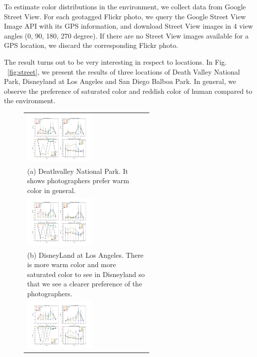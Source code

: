 To estimate color distributions in the environment, we collect data from Google Street View.
For each geotagged Flickr photo, we query the Google Street View Image API with its GPS information, and download Street View images in 4 view angles (0, 90, 180, 270 degree). If there are no Street View images available for a GPS location, we discard the corresponding Flickr photo.

The result turns out to be very interesting in respect to locations. In Fig. ~\ref{fig:street}, we present the results of three locations of Death Valley National Park, Disneyland at Los Angeles and San Diego Balboa Park. 
In general, we observe the preference of saturated color and reddish color of human compared to the environment.

\begin{figure}
\centering
\begin{tabular}{m{0.6\linewidth}}
\includegraphics[width=0.55\textwidth]{figures/chapter3/deathvalleyflkstr.png} \\
(a) Deathvalley National Park. It shows photographers prefer warm color in general.\\
\includegraphics[width=0.55\textwidth]{figures/chapter3/disneyflkstr.png} \\
(b) DisneyLand at Los Angeles. There is more warm color and more saturated color to see in Disneyland so that we see a clearer preference of the photographers.\\
\includegraphics[width=0.55\textwidth]{figures/chapter3/sdzooflkstr.png} \\

\end{tabular}
\end{figure}
